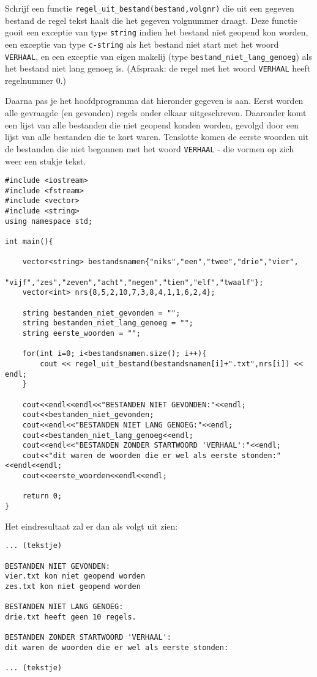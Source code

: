 \beginoef
Schrijf een functie \verb}regel_uit_bestand(bestand,volgnr)} die uit een gegeven bestand de regel tekst haalt 
die het gegeven volgnummer draagt. 
Deze functie gooit een exceptie van type \verb}string} indien het bestand niet geopend kon worden,
een exceptie van type \verb}c-string} als het bestand niet start met het woord \verb}VERHAAL}, en een exceptie van eigen makelij (type \verb}bestand_niet_lang_genoeg}) als het bestand niet lang genoeg is.
(Afspraak: de regel met het woord \verb}VERHAAL} heeft regelnummer 0.)

Daarna pas je het hoofdprogramma dat hieronder gegeven is aan.
Eerst worden alle gevraagde (en gevonden) regels onder elkaar uitgeschreven.
Daaronder komt een lijst van alle bestanden die niet geopend konden worden,
gevolgd door een lijst van alle bestanden die te kort waren.
Tenslotte komen de eerste woorden uit de bestanden die niet begonnen met het woord \verb}VERHAAL} - die vormen op zich weer een stukje tekst.
\begin{footnotesize}
\begin{verbatim}
#include <iostream>
#include <fstream>
#include <vector>
#include <string>
using namespace std;

int main(){     
     
    vector<string> bestandsnamen{"niks","een","twee","drie","vier",
                     "vijf","zes","zeven","acht","negen","tien","elf","twaalf"};
    vector<int> nrs{8,5,2,10,7,3,8,4,1,1,6,2,4};
     
    string bestanden_niet_gevonden = "";
    string bestanden_niet_lang_genoeg = "";
    string eerste_woorden = "";
     
    for(int i=0; i<bestandsnamen.size(); i++){
        cout << regel_uit_bestand(bestandsnamen[i]+".txt",nrs[i]) << endl;
    }
     
    cout<<endl<<endl<<"BESTANDEN NIET GEVONDEN:"<<endl;
    cout<<bestanden_niet_gevonden;
    cout<<endl<<"BESTANDEN NIET LANG GENOEG:"<<endl;
    cout<<bestanden_niet_lang_genoeg<<endl;
    cout<<endl<<"BESTANDEN ZONDER STARTWOORD 'VERHAAL':"<<endl;
    cout<<"dit waren de woorden die er wel als eerste stonden:"<<endl<<endl;
    cout<<eerste_woorden<<endl<<endl;
     
    return 0;   
}
\end{verbatim}
\end{footnotesize}
Het eindresultaat zal er dan als volgt uit zien:
\begin{footnotesize}
\begin{verbatim}
... (tekstje)

BESTANDEN NIET GEVONDEN:
vier.txt kon niet geopend worden
zes.txt kon niet geopend worden

BESTANDEN NIET LANG GENOEG:
drie.txt heeft geen 10 regels.

BESTANDEN ZONDER STARTWOORD 'VERHAAL':
dit waren de woorden die er wel als eerste stonden:

... (tekstje)
\end{verbatim}
\end{footnotesize}


\endoef
